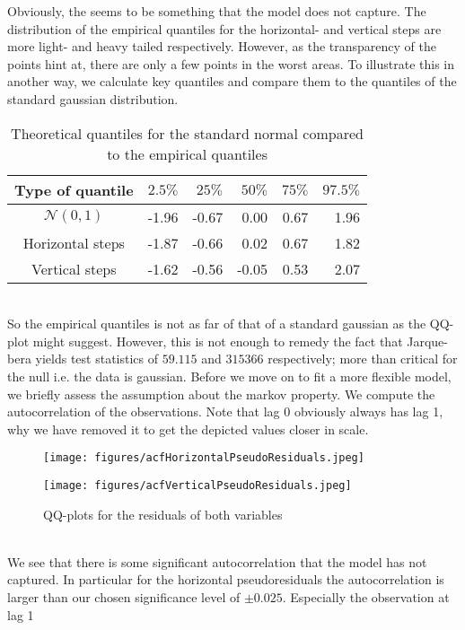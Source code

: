 Obviously, the seems to be something that the model does not capture. The distribution of the empirical quantiles for the horizontal- and vertical steps are more light- and heavy tailed respectively. However, as the transparency of the points hint at, there are only a few points in the worst areas. To illustrate this in another way, we calculate key quantiles and compare them to the quantiles of the standard gaussian distribution.
\begin{table}[h]
    \centering
    \begin{tabular}{crrrrr}
      \hline
     Type of quantile & $2.5\%$ & $25\%$ & $50\%$ & $75\%$ & $97.5\%$ \\ 
     \hline
     $\mathcal{N}(0,1)$ & -1.96 & -0.67 & 0.00 & 0.67 & 1.96 \\ 
     Horizontal steps & -1.87 & -0.66 & 0.02 & 0.67 & 1.82 \\ 
     Vertical steps & -1.62 & -0.56 & -0.05 & 0.53 & 2.07 \\ 
        \hline
    \end{tabular}
    \caption{Theoretical quantiles for the standard normal compared to the empirical quantiles}
\end{table}\\
So the empirical quantiles is not as far of that of a standard gaussian as the QQ-plot might suggest. However, this is not enough to remedy the fact that Jarque-bera \cite{tseries} yields test statistics of $59.115$ and $315366$ respectively; more than critical for the null i.e. the data is gaussian. Before we move on to fit a more flexible model, we briefly assess the assumption about the markov property. We compute the autocorrelation of the observations. Note that lag 0 obviously always has lag 1, why we have removed it to get the depicted values closer in scale.
\begin{figure}[h]
  \centering
  \begin{minipage}[b]{0.34\textwidth}
    \texttt{[image: figures/acfHorizontalPseudoResiduals.jpeg]}
  \end{minipage}
  \hspace{0.03\textwidth}
  \begin{minipage}[b]{0.34\textwidth}
    \texttt{[image: figures/acfVerticalPseudoResiduals.jpeg]}
  \end{minipage}
  \caption{QQ-plots for the residuals of both variables}
  \label{combinedACFPlots}
\end{figure}\\
We see that there is some significant autocorrelation that the model has not captured. In particular for the horizontal pseudoresiduals the autocorrelation is larger than our chosen significance level of $\pm 0.025$. Especially the observation at lag 1\newpage
